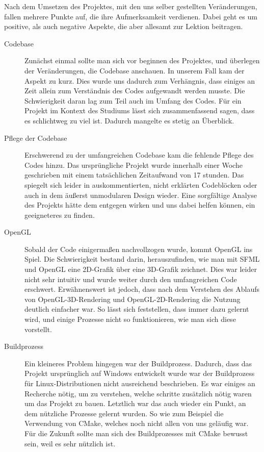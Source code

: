 \documentclass{article}
\begin{document}
Nach dem Umsetzen des Projektes, mit den uns selber gestellten Veränderungen, fallen mehrere Punkte auf, die ihre Aufmerksamkeit verdienen. Dabei geht es um positive, als auch negative Aspekte, die aber allesamt zur Lektion beitragen.
\newline
\begin{description}
  \item[Codebase] Zunächst einmal sollte man sich vor beginnen des Projektes, und überlegen der Veränderungen, die Codebase anschauen. In unserem Fall kam der Aspekt zu kurz. Dies wurde uns dadurch zum Verhängnis, dass einiges an Zeit allein zum Verständnis des Codes aufgewandt werden musste. Die Schwierigkeit daran lag zum Teil auch im Umfang des Codes. Für ein Projekt im Kontext des Studiums lässt sich zusammenfassend sagen, dass es schlichtweg zu viel ist. Dadurch mangelte es stetig an Überblick.
  \item[Pflege der Codebase] Erschwerend zu der umfangreichen Codebase kam die fehlende Pflege des Codes hinzu. Das ursprüngliche Projekt wurde innerhalb einer Woche geschrieben mit einem tatsächlichen Zeitaufwand von 17 stunden. Das spiegelt sich leider in auskommentierten, nicht erklärten Codeblöcken oder auch in dem äu\ss{}erst unmodularen Design wieder. Eine sorgfältige Analyse des Projekts hätte dem entgegen wirken und uns dabei helfen können, ein geeigneteres zu finden.
  \item[OpenGL] Sobald der Code einigermaßen nachvollzogen wurde, kommt OpenGL ins Spiel. Die Schwierigkeit bestand darin, herauszufinden, wie man mit SFML und OpenGL eine 2D-Grafik über eine 3D-Grafik zeichnet. Dies war leider nicht sehr intuitiv und wurde weiter durch den umfangreichen Code erschwert. Erwähnenswert ist jedoch, dass nach dem Verstehen des Ablaufs von OpenGL-3D-Rendering und OpenGL-2D-Rendering die Nutzung deutlich einfacher war. So lässt sich feststellen, dass immer dazu gelernt wird, und einige Prozesse nicht so funktionieren, wie man sich diese vorstellt.
  \item[Buildprozess] Ein kleineres Problem hingegen war der Buildprozess. Dadurch, dass das Projekt ursprünglich auf Windows entwickelt wurde war der Buildprozess für Linux-Distributionen nicht ausreichend beschrieben. Es war einiges an Recherche nötig, um zu verstehen, welche schritte zusätzlich nötig waren um das Projekt zu bauen. Letztlich war das auch wieder ein Punkt, an dem nützliche Prozesse gelernt wurden. So wie zum Beispiel die Verwendung von CMake, welches noch nicht allen von uns geläufig war. Für die Zukunft sollte man sich des Buildprozesses mit CMake bewusst sein, weil es sehr nützlich ist. 

\end{description}
\end{document}
